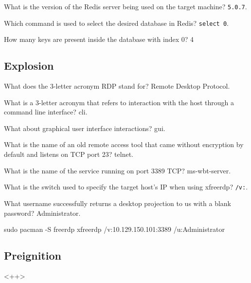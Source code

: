 \documentclass[a4paper,12pt]{article}
\newcommand{\bashinline}[1]{\texttt{#1}}
\begin{document}
What is the version of the Redis server being used on the target machine? \bashinline{5.0.7}.

Which command is used to select the desired database in Redis? \bashinline{select 0}.

How many keys are present inside the database with index 0? 4

\subsection{Explosion \faWindows}
What does the 3-letter acronym RDP stand for? Remote Desktop Protocol.

What is a 3-letter acronym that refers to interaction with the host through a command line interface? cli.

What about graphical user interface interactions? gui.

What is the name of an old remote access tool that came without encryption by default and listens on TCP port 23? telnet.

What is the name of the service running on port 3389 TCP? ms-wbt-server.

What is the switch used to specify the target host's IP when using xfreerdp? \bashinline{/v:}.

What username successfully returns a desktop projection to us with a blank password? Administrator.
\begin{bash}
sudo pacman -S freerdp
xfreerdp /v:10.129.150.101:3389 /u:Administrator
\end{bash}

\subsection{Preignition \faLinux}

<++>
\end{document}
